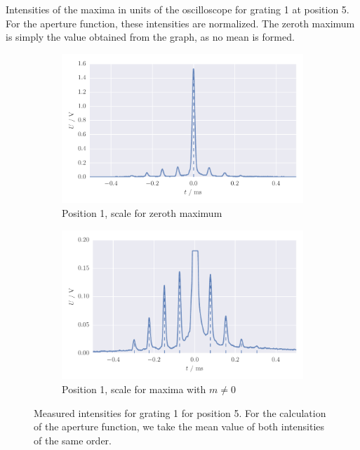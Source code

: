 \begin{table}[htdp]
    \centering
    
    \caption{
        Intensities of the maxima in units of the oscilloscope for grating 1 at position 5. 
        For the aperture function, 
        these intensities are normalized. The zeroth maximum is simply the value obtained 
        from the graph, as no mean is formed. 
        }
    \label{tab:intensities}
\end{table}
\begin{figure}
    \centering
    \begin{subfigure}[b]{\pltw}
        \includegraphics[width=\textwidth]{figures/aperture_5a}
        \caption{Position 1, scale for zeroth maximum}
        \label{}
    \end{subfigure}\quad
    \begin{subfigure}[b]{\pltw}
        \includegraphics[width=\textwidth]{figures/aperture_5b}
        \caption{Position 1, scale for maxima with $m \neq 0$}
        \label{}
    \end{subfigure}
    \caption{
        Measured intensities for grating 1 for position 5. 
        For the calculation of the aperture function, 
        we take the mean value of both intensities of the same order. 
        }
    \label{fig:aperture_positions_detail}
\end{figure}
